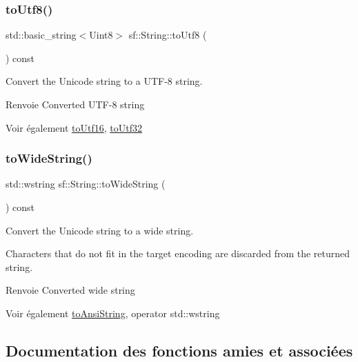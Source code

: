 \subsubsection{\texorpdfstring{to\+Utf8()}{toUtf8()}}
{\footnotesize\ttfamily std\+::basic\+\_\+string$<$Uint8$>$ sf\+::\+String\+::to\+Utf8 (\begin{DoxyParamCaption}{ }\end{DoxyParamCaption}) const}



Convert the Unicode string to a U\+T\+F-\/8 string. 

\begin{DoxyReturn}{Renvoie}
Converted U\+T\+F-\/8 string
\end{DoxyReturn}
\begin{DoxySeeAlso}{Voir également}
\hyperlink{classsf_1_1String_a476374646d92143c0efcae8ac1fbe4ce}{to\+Utf16}, \hyperlink{classsf_1_1String_af1f2a3c069ce9e53fe901065cff41f68}{to\+Utf32} 
\end{DoxySeeAlso}
\mbox{\label{classsf_1_1String_a9d81aa3103e7e2062bd85d912a5aecf1}} 
\subsubsection{\texorpdfstring{to\+Wide\+String()}{toWideString()}}
{\footnotesize\ttfamily std\+::wstring sf\+::\+String\+::to\+Wide\+String (\begin{DoxyParamCaption}{ }\end{DoxyParamCaption}) const}



Convert the Unicode string to a wide string. 

Characters that do not fit in the target encoding are discarded from the returned string.

\begin{DoxyReturn}{Renvoie}
Converted wide string
\end{DoxyReturn}
\begin{DoxySeeAlso}{Voir également}
\hyperlink{classsf_1_1String_ada5d5bba4528aceb0a1e298553e6c30a}{to\+Ansi\+String}, operator std\+::wstring 
\end{DoxySeeAlso}


\subsection{Documentation des fonctions amies et associées}
\mbox{\label{classsf_1_1String_a2b592c36be218b4811795fdc84eecc69}} 
